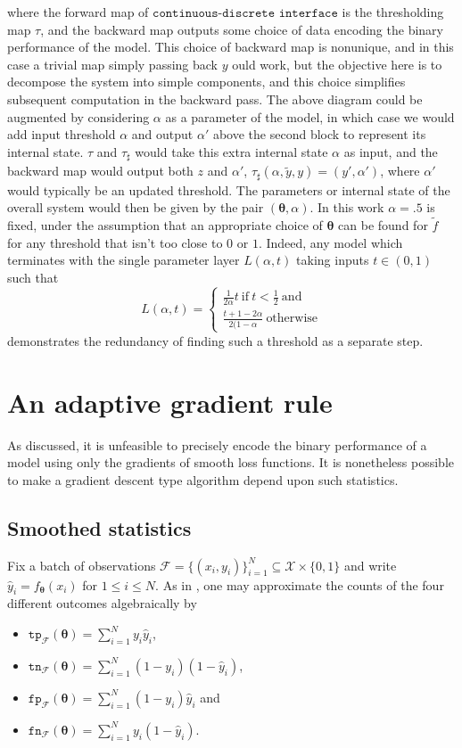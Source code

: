\documentclass[10pt,a4paper]{article}
\begin{document}
where the forward map of $\texttt{continuous-discrete interface}$ is the thresholding map $\tau$, and the backward map outputs some choice of data encoding the binary performance of the model.
This choice of backward map is nonunique, and in this case a trivial map simply passing back $y$ ould work, but the objective here is to decompose the system into simple components, and this choice simplifies subsequent computation in the backward pass.
The above diagram could be augmented by considering $\alpha$ as a parameter of the model, in which case we would add input threshold $\alpha$ and output $\alpha'$ above the second block to represent its internal state.
$\tau$ and $\tau_\sharp$ would take this extra internal state $\alpha$ as input, and the backward map would output both $z$ and $\alpha'$, $\tau_\sharp(\alpha,\tilde y,y)=(y',\alpha')$, where $\alpha'$ would typically be an updated threshold.
The parameters or internal state of the overall system would then be given by the pair $(\boldsymbol\theta,\alpha)$.
In this work $\alpha=.5$ is fixed, under the assumption that an appropriate choice of $\boldsymbol\theta$ can be found for $\tilde f$ for any threshold that isn't too close to $0$ or $1$.
Indeed, any model which terminates with the single parameter layer $L(\alpha,t)$ taking inputs $t\in(0,1)$ such that
$$
L(\alpha,t)=\begin{cases}\tfrac1{2\alpha}t~\text{if}~t<\tfrac12~\text{and}\\\tfrac{t+1-2\alpha}{2(1-\alpha}~\text{otherwise}\end{cases}
$$
demonstrates the redundancy of finding such a threshold as a separate step.
\section{An adaptive gradient rule}

As discussed, it is unfeasible to precisely encode the binary performance of a model using only the gradients of smooth loss functions.
It is nonetheless possible to make a gradient descent type algorithm depend upon such statistics.

\subsection{Smoothed statistics}

Fix a batch of observations $\mathcal F=\{(x_i,y_i)\}_{i=1}^N\subseteq\mathcal X\times\{0,1\}$ and write $\hat y_i=f_{\boldsymbol\theta}(x_i)$ for $1\leq i\leq N$.
As in \cite{lee2021surrogate}, one may  approximate the counts of the four different outcomes algebraically by
\begin{itemize}
  \item $\texttt{tp}_\mathcal F(\boldsymbol\theta)=\sum_{i=1}^N y_i\hat y_i$,
  \item $\texttt{tn}_\mathcal F(\boldsymbol\theta)=\sum_{i=1}^N(1-y_i)(1-\hat y_i)$,
  \item $\texttt{fp}_\mathcal F(\boldsymbol\theta)=\sum_{i=1}^N(1-y_i)\hat y_i$ and
  \item $\texttt{fn}_\mathcal F(\boldsymbol\theta)=\sum_{i=1}^Ny_i(1-\hat y_i)$.
\end{itemize}
\end{document}
